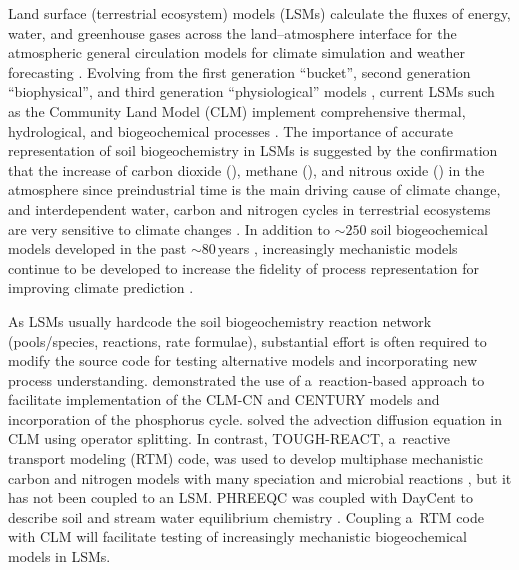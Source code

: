 \documentclass[gmdd, online, hvmath]{copernicus}
\begin{document}
\introduction

      Land surface (terrestrial ecosystem) models (LSMs) calculate the
      fluxes of energy, water, and greenhouse gases across the
      land--atmosphere interface for the atmospheric general circulation
      models for climate simulation and weather forecasting
      \citep{Sellers1997}. Evolving from the first generation ``bucket'',
      second generation ``biophysical'', and third generation
      ``physiological'' models \citep{Seneviratne2010}, current LSMs such as
      the Community Land Model (CLM) implement comprehensive thermal,
      hydrological, and biogeochemical processes \citep{Oleson2013}. The
      importance of accurate representation of soil biogeochemistry in LSMs
      is suggested by the confirmation that the increase of carbon dioxide
      (), methane (), and nitrous oxide ()
      in the atmosphere since preindustrial time is the main driving cause
      of climate change, and interdependent water, carbon and nitrogen
      cycles in terrestrial ecosystems are very sensitive to climate changes
      \citep{IPCC2013}. In addition to $\sim 250$ soil biogeochemical models
      developed in the past $\sim 80$\,years \citep{Manzoni2009},
      increasingly mechanistic models continue to be developed to increase
      the fidelity of process representation for improving climate
      prediction \citep[e.g.,][]{Riley2014}.

      As LSMs usually hardcode the soil biogeochemistry reaction network
      (pools/species, reactions, rate formulae), substantial effort is often
      required to modify the source code for testing alternative models and
      incorporating new process understanding. \citet{Fang2013} demonstrated
      the use of a~reaction-based approach to facilitate implementation of
      the CLM-CN and CENTURY models and incorporation of the phosphorus
      cycle.  \citet{Tang2013b} solved the advection diffusion equation in
      CLM using operator splitting. In contrast, TOUGH-REACT, a~reactive
      transport modeling (RTM) code, was used to develop multiphase
      mechanistic carbon and nitrogen models with many speciation and
      microbial reactions \citep{Maggi2008,Gu2010,Riley2014}, but it has not
      been coupled to an LSM. PHREEQC was coupled with DayCent to describe
      soil and stream water equilibrium chemistry
      \citep{Hartman2007}. Coupling a~RTM code with CLM will facilitate
      testing of increasingly mechanistic biogeochemical models in LSMs.
\end{document}
